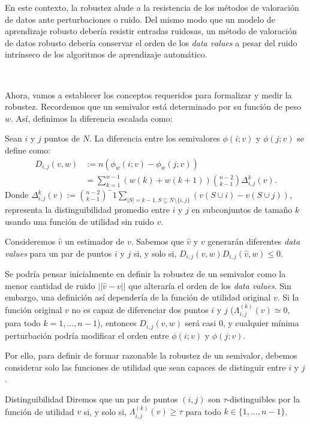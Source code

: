 En este contexto, la robustez alude a la resistencia
de los métodos de valoración de datos ante perturbaciones
o ruido. Del mismo modo que un modelo de aprendizaje robusto
debería resistir entradas ruidosas, un método de valoración de
datos robusto debería conservar el orden de los \textit{data values} a pesar
del ruido intrínseco de los algoritmos
de aprendizaje automático.

\

Ahora, vamos a establecer los conceptos requeridos para
formalizar y medir la robustez. Recordemos que un semivalor
está determinado por su función de peso $w$. Así, definimos
la diferencia escalada como:


\begin{definition}
  Sean $i$ y $j$ puntos de $N$. La diferencia
  entre los semivalores $\phi(i;v)$ y $\phi(j;v)$
  se define como:
  \begin{align}
    D_{i,j}(v,w)&:= n(\phi_w(i;v)-\phi_w(j;v))\\
    &=\sum_{k=1}^{n-1} (w(k)+w(k+1)) \binom{n-2}{k-1}
    \Delta_{i,j}^k(v).
  \end{align}
  Donde $\Delta_{i,j}^k(v):=\binom{n-2}{k-1}^-1 \sum_{|S|=k-1,
  S\subseteq N \setminus \{i,j\}} (v(S \cup i)-v(S \cup j))$,
  representa la distinguibilidad promedio entre $i$ y $j$ en
  subconjuntos de tamaño $k$ usando una función de utilidad
  sin ruido $v$.
\end{definition}

Consideremos $\hat{v}$ un estimador de $v$. Sabemos que
$\hat{v}$ y $v$ generarán diferentes \textit{data values}
para un par de puntos $i$ y $j$ si, y solo si,
$D_{i,j}(v,w)D_{i,j}(\hat{v},w) \leq 0$.

Se podría pensar inicialmente en definir
la robustez de un semivalor como la menor cantidad de ruido
$||\hat{v}-v||$ que alteraría el orden de los
\textit{data values}. Sin embargo, una definición
así dependería de la función de utilidad original $v$.
Si la función original $v$ no es capaz de diferenciar
dos puntos $i$ y $j$ ($\Lambda_{i,j}^{(k)}(v)\simeq 0$, para
todo $k=1,\dots,n-1$), entonces $D_{i,j}(v,w)$ será
casi 0, y cualquier mínima perturbación podría 
modificar el orden entre $\phi(i;v)$ y $\phi(j;v)$. 

Por ello, para definir de formar razonable la
robustez de un semivalor, debemos considerar solo las
funciones de utilidad que sean capaces de distinguir
entre $i$ y $j$.

\begin{definition}{Distinguibilidad}
  Diremos que un par de puntos $(i,j)$ son $\tau$-distinguibles por
  la función de utilidad $v$ si, y solo si, $\Lambda_{i,j}^{(k)}(v) \geq \tau$
  para todo $k \in \{1,\dots,n-1\}$.
\end{definition}

